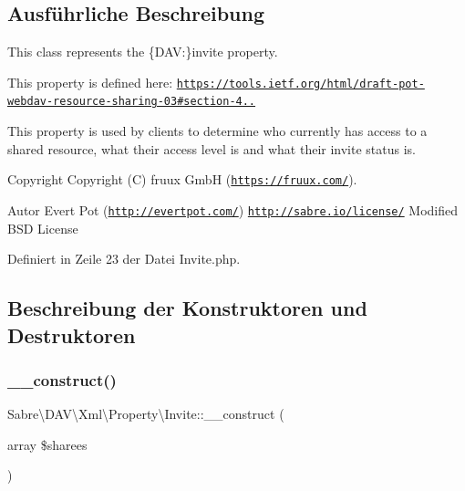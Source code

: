 \subsection{Ausführliche Beschreibung}
This class represents the \{D\+AV\+:\}invite property.

This property is defined here\+: \href{https://tools.ietf.org/html/draft-pot-webdav-resource-sharing-03#section-4.4.2}{\tt https\+://tools.\+ietf.\+org/html/draft-\/pot-\/webdav-\/resource-\/sharing-\/03\#section-\/4..}

This property is used by clients to determine who currently has access to a shared resource, what their access level is and what their invite status is.

\begin{DoxyCopyright}{Copyright}
Copyright (C) fruux GmbH (\href{https://fruux.com/}{\tt https\+://fruux.\+com/}). 
\end{DoxyCopyright}
\begin{DoxyAuthor}{Autor}
Evert Pot (\href{http://evertpot.com/}{\tt http\+://evertpot.\+com/})  \href{http://sabre.io/license/}{\tt http\+://sabre.\+io/license/} Modified B\+SD License 
\end{DoxyAuthor}


Definiert in Zeile 23 der Datei Invite.\+php.



\subsection{Beschreibung der Konstruktoren und Destruktoren}
\mbox{\label{class_sabre_1_1_d_a_v_1_1_xml_1_1_property_1_1_invite_ac1b085c8a9e42843641f5e41eeafc88f}} 
\subsubsection{\texorpdfstring{\+\_\+\+\_\+construct()}{\_\_construct()}}
{\footnotesize\ttfamily Sabre\textbackslash{}\+D\+A\+V\textbackslash{}\+Xml\textbackslash{}\+Property\textbackslash{}\+Invite\+::\+\_\+\+\_\+construct (\begin{DoxyParamCaption}\item[{array}]{\$sharees }\end{DoxyParamCaption})}

